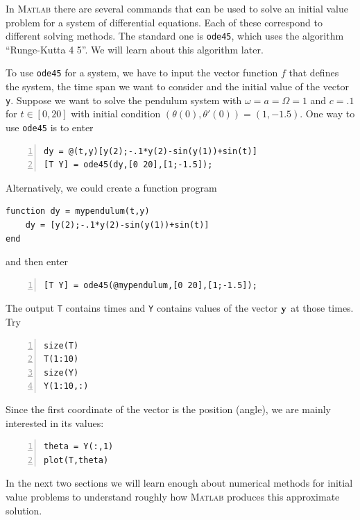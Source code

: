 In \textsc{Matlab} there are several commands that can be used to
solve an initial value problem for a system of differential equations.
Each of these correspond to different solving methods. The standard
one is \verb&ode45&, which uses the algorithm ``Runge-Kutta 4
5''. We will learn about this algorithm later.

To use \verb&ode45& for a system, we have to input the vector function
$f$ that defines the system, the time span we want to consider and the
initial value of the vector \verb&y&.
%
Suppose we want to solve the pendulum system with \(\omega=a=\Omega=1\)
and $c = .1$ for \(t\in [0,20]\)
with initial condition \((\theta(0),\theta'(0))=(1,-1.5)\).
One way to use \verb&ode45& is to enter
\begin{lstlisting}[frame=none,numbers=left]
dy = @(t,y)[y(2);-.1*y(2)-sin(y(1))+sin(t)]
[T Y] = ode45(dy,[0 20],[1;-1.5]);
\end{lstlisting}
Alternatively, we could create a function program
\begin{lstlisting}
function dy = mypendulum(t,y)
    dy = [y(2);-.1*y(2)-sin(y(1))+sin(t)]
end
\end{lstlisting}
and then enter
\begin{lstlisting}[frame=none,numbers=left]
[T Y] = ode45(@mypendulum,[0 20],[1;-1.5]);
\end{lstlisting}


The output \verb&T& contains times and \verb&Y& contains values of the
vector $\mathbf{y}$ at those times. Try
\begin{lstlisting}[frame=none,numbers=left]
size(T)
T(1:10)
size(Y)
Y(1:10,:)
\end{lstlisting}
Since the first coordinate of the vector is the position (angle), we
are
mainly interested in its values:
\begin{lstlisting}[frame=none,numbers=left]
theta = Y(:,1)
plot(T,theta)
\end{lstlisting}

In the next two sections we will learn enough about numerical methods
for initial value problems to understand roughly how \textsc{Matlab}
produces this approximate solution.

\newpage
